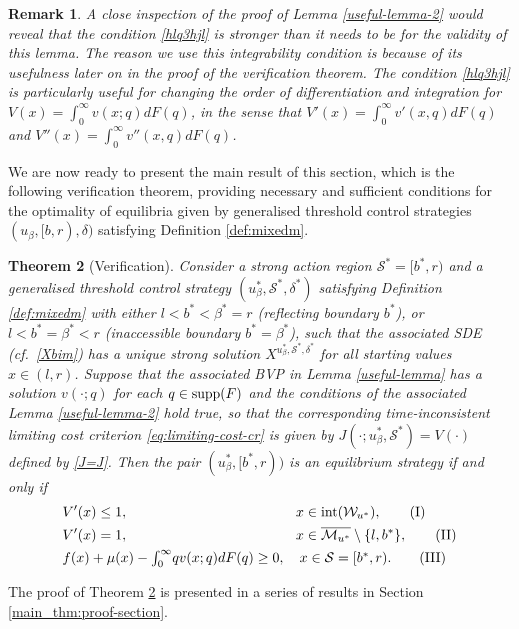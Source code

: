 \documentclass[11pt]{article} %
\newtheorem{theorem}{Theorem}[section]
\newtheorem{remark}[theorem]{Remark}
\numberwithin{komcounter}{section}
\newcommand{\ol}{\overline}
\begin{document}
\begin{remark}\label{asdqwrr}
A close inspection of the proof of Lemma \ref{useful-lemma-2} would reveal that the condition \eqref{hlq3hjl} is stronger than it needs to be for the validity of this lemma. 
The reason we use this integrability condition is because of its usefulness later on in the proof of the verification theorem. 
The condition \eqref{hlq3hjl} is particularly useful for changing the order of differentiation and integration for $V(x)=\int_0^\infty v(x;q)dF(q)$, in the sense that $V'(x)=\int_0^\infty v'(x,q)dF(q)$ and $V''(x)=\int_0^\infty v''(x,q)dF(q)$. 
\end{remark}

We are now ready to present the main result of this section, which is the following verification theorem, providing necessary and sufficient conditions for the optimality of equilibria given by generalised threshold control strategies $(u_\beta,[b,r),\delta)$ satisfying Definition \ref{def:mixedm}. 


\begin{theorem}[Verification] \label{main_thm}
Consider a strong action region $\mathcal{S}^*=[b^*,r)$ and a generalised threshold control strategy $(u_\beta^*,\mathcal{S}^*,\delta^*)$ satisfying Definition \ref{def:mixedm} with either $l<b^*<\beta^*=r$ (reflecting boundary $b^*$), or $l<b^*=\beta^*<r$ (inaccessible boundary $b^*=\beta^*$), such that the associated SDE (cf.~\eqref{Xbim}) has a unique strong solution $X^{u_\beta^*,\mathcal{S}^*,\delta^*}$ for all starting values $x \in (l,r)$. 
Suppose that 
the associated BVP in Lemma \ref{useful-lemma} has a solution $v(\cdot;q)$ for each $q \in {\rm supp}(F)$ and the conditions of the associated Lemma \ref{useful-lemma-2} hold true, 
so that the corresponding time-inconsistent limiting cost criterion \eqref{eq:limiting-cost-cr} is given by $J(\cdot;u_\beta^*,\mathcal{S}^*) = V(\cdot)$ defined by \eqref{J=J}.  Then the pair $(u_\beta^*, [b^*,r))$ is an equilibrium strategy if and only if 
\begin{align}
&V'(x) \leq 1, \qquad \qquad \qquad \qquad \qquad \qquad  x \in {\rm int} (\mathcal{W}_{u^*}), \label{mainthmcond1} \tag{I}\\
&V'(x) = 1, \qquad \qquad \qquad \qquad \qquad \qquad  x \in \ol{\mathcal{M}_{u^*}}\setminus \{l,b^*\}, \label{mainthmcond2} \tag{II}\\
&f(x) + \mu(x) - \textstyle{\int_{0}^{\infty}} q v(x;q) dF(q) \geq 0, 
\quad x \in \mathcal{S}=[b^*,r). \label{mainthmcond3} \tag{III}
\end{align}
\end{theorem}
The proof of Theorem \ref{main_thm} is presented in a series of results in Section \ref{main_thm:proof-section}. 
\end{document}
